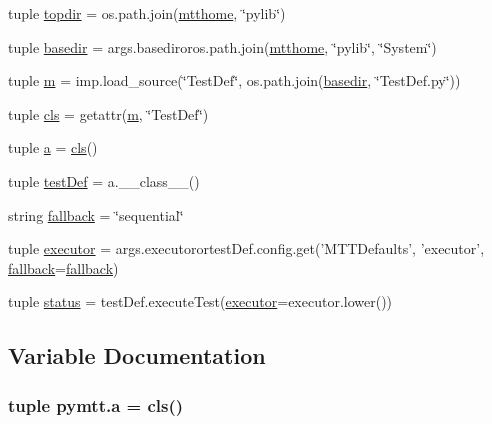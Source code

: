 \begin{DoxyCompactItemize}
\item 
tuple \hyperlink{namespacepymtt_ac673c895b8c93a029d2a1655c04af315}{topdir} = os.\-path.\-join(\hyperlink{namespacepymtt_a109ef76f074b08666398bf6a38219cfc}{mtthome}, \char`\"{}pylib\char`\"{})
\item 
tuple \hyperlink{namespacepymtt_a57729393cfbd99464570d7fa5ad9fa05}{basedir} = args.\-basediroros.\-path.\-join(\hyperlink{namespacepymtt_a109ef76f074b08666398bf6a38219cfc}{mtthome}, \char`\"{}pylib\char`\"{}, \char`\"{}System\char`\"{})
\item 
tuple \hyperlink{namespacepymtt_ab13a60c31fa69917ce06c1a2631aaf02}{m} = imp.\-load\-\_\-source(\char`\"{}Test\-Def\char`\"{}, os.\-path.\-join(\hyperlink{namespacepymtt_a57729393cfbd99464570d7fa5ad9fa05}{basedir}, \char`\"{}Test\-Def.\-py\char`\"{}))
\item 
tuple \hyperlink{namespacepymtt_a17f658b5d141d51664bb3ede8830c4c0}{cls} = getattr(\hyperlink{namespacepymtt_ab13a60c31fa69917ce06c1a2631aaf02}{m}, \char`\"{}Test\-Def\char`\"{})
\item 
tuple \hyperlink{namespacepymtt_a55825c16c4bd231f7ffbd0fe52407e3f}{a} = \hyperlink{namespacepymtt_a17f658b5d141d51664bb3ede8830c4c0}{cls}()
\item 
tuple \hyperlink{namespacepymtt_afebe539e6104da8ebd3d06b7a0e77fe7}{test\-Def} = a.\-\_\-\-\_\-class\-\_\-\-\_\-()
\item 
string \hyperlink{namespacepymtt_a5d5ee597f85e5c40ec6a923a4398c291}{fallback} = \char`\"{}sequential\char`\"{}
\item 
tuple \hyperlink{namespacepymtt_a283715e769294f7b1362c85498cdf2a3}{executor} = args.\-executorortest\-Def.\-config.\-get('M\-T\-T\-Defaults', 'executor', \hyperlink{namespacepymtt_a5d5ee597f85e5c40ec6a923a4398c291}{fallback}=\hyperlink{namespacepymtt_a5d5ee597f85e5c40ec6a923a4398c291}{fallback})
\item 
tuple \hyperlink{namespacepymtt_a1a2fd13626c1c2d248cedc138e8660ec}{status} = test\-Def.\-execute\-Test(\hyperlink{namespacepymtt_a283715e769294f7b1362c85498cdf2a3}{executor}=executor.\-lower())
\end{DoxyCompactItemize}


\subsection{Variable Documentation}
\hypertarget{namespacepymtt_a55825c16c4bd231f7ffbd0fe52407e3f}{
\subsubsection[{a}]{\setlength{\rightskip}{0pt plus 5cm}tuple pymtt.\-a = {\bf cls}()}}\label{namespacepymtt_a55825c16c4bd231f7ffbd0fe52407e3f}


